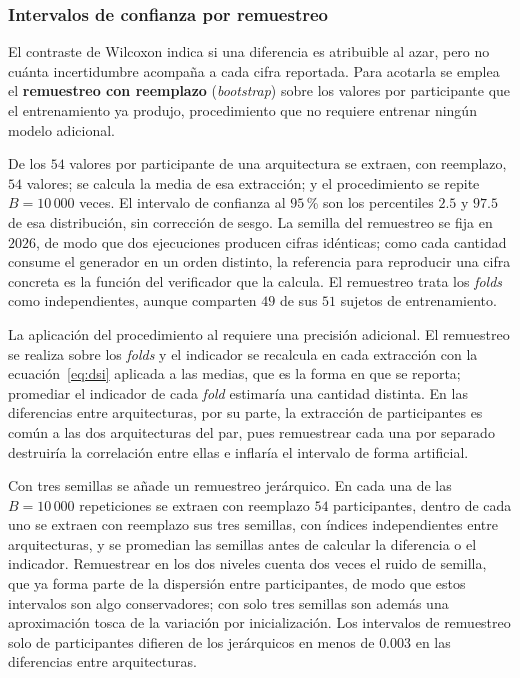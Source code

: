 \subsubsection{Intervalos de confianza por remuestreo}
\label{sec:bootstrap}

El contraste de Wilcoxon indica si una diferencia es atribuible al azar, pero no cuánta
incertidumbre acompaña a cada cifra reportada. Para acotarla se emplea el
\textbf{remuestreo con reemplazo} (\textit{bootstrap}) \cite{efron1979} sobre los valores por participante
que el entrenamiento ya produjo, procedimiento que no requiere entrenar ningún modelo
adicional.

De los $54$ valores por participante de una arquitectura se extraen, con reemplazo, $54$
valores; se calcula la media de esa extracción; y el procedimiento se repite
$B = 10\,000$ veces. El intervalo de confianza al $95$\,\% son los percentiles $2.5$ y
$97.5$ de esa distribución, sin corrección de sesgo. La semilla del remuestreo se fija en
$2026$, de modo que dos ejecuciones producen cifras idénticas; como cada cantidad consume
el generador en un orden distinto, la referencia para reproducir una cifra concreta es la
función del verificador que la calcula. El remuestreo trata los \textit{folds} \loso{} como
independientes, aunque comparten $49$ de sus $51$ sujetos de entrenamiento.

La aplicación del procedimiento al \dsi{} requiere una precisión adicional. El remuestreo
se realiza sobre los \textit{folds} y el indicador se recalcula en cada extracción con la
ecuación~\eqref{eq:dsi} aplicada a las medias, que es la forma en que se reporta; promediar
el indicador de cada \textit{fold} estimaría una cantidad distinta. En las diferencias
entre arquitecturas, por su parte, la extracción de participantes es común a las dos
arquitecturas del par, pues remuestrear cada una por separado destruiría la correlación
entre ellas e inflaría el intervalo de forma artificial.

Con tres semillas se añade un remuestreo jerárquico. En cada una de las $B = 10\,000$ repeticiones
se extraen con reemplazo $54$ participantes, dentro de cada uno se extraen con reemplazo sus tres
semillas, con índices independientes entre arquitecturas, y se promedian las semillas antes de
calcular la diferencia o el indicador. Remuestrear en los dos niveles cuenta dos veces el ruido de
semilla, que ya forma parte de la dispersión entre participantes, de modo que estos intervalos son
algo conservadores; con solo tres semillas son además una aproximación tosca de la variación por
inicialización. Los intervalos de remuestreo solo de participantes difieren de los jerárquicos en
menos de $0.003$ en las diferencias entre arquitecturas.

